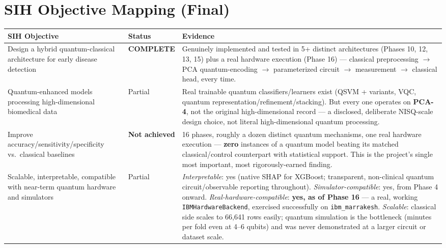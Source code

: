 \documentclass[11pt,a4paper]{article}
\newcommand{\code}[1]{\texttt{\small #1}}
\newcommand{\done}{\textcolor{donecolor}{\textbf{COMPLETE}}}
\begin{document}
\section{SIH Objective Mapping (Final)}
\label{sec:objective-mapping}

\begin{center}
\small
\begin{tabularx}{\textwidth}{@{}p{5.6cm}p{2.0cm}Y@{}}
\toprule
\textbf{SIH Objective} & \textbf{Status} & \textbf{Evidence} \\
\midrule
Design a hybrid quantum-classical architecture for early disease detection & \done & Genuinely implemented and tested in 5+ distinct architectures (Phases 10, 12, 13, 15) plus a real hardware execution (Phase 16) --- classical preprocessing $\to$ PCA quantum-encoding $\to$ parameterized circuit $\to$ measurement $\to$ classical head, every time. \\
Quantum-enhanced models processing high-dimensional biomedical data & Partial & Real trainable quantum classifiers/learners exist (QSVM + variants, VQC, quantum representation/refinement/stacking). But every one operates on \textbf{PCA-4}, not the original high-dimensional record --- a disclosed, deliberate NISQ-scale design choice, not literal high-dimensional quantum processing. \\
Improve accuracy/sensitivity/specificity vs.\ classical baselines & \textbf{Not achieved} & 16 phases, roughly a dozen distinct quantum mechanisms, one real hardware execution --- \textbf{zero} instances of a quantum model beating its matched classical/control counterpart with statistical support. This is the project's single most important, most rigorously-earned finding. \\
Scalable, interpretable, compatible with near-term quantum hardware and simulators & Partial & \emph{Interpretable}: yes (native SHAP for XGBoost; transparent, non-clinical quantum circuit/observable reporting throughout). \emph{Simulator-compatible}: yes, from Phase 4 onward. \emph{Real-hardware-compatible}: \textbf{yes, as of Phase 16} --- a real, working \code{IBMHardwareBackend}, exercised successfully on \code{ibm\_marrakesh}. \emph{Scalable}: classical side scales to 66,641 rows easily; quantum simulation is the bottleneck (minutes per fold even at 4--6 qubits) and was never demonstrated at a larger circuit or dataset scale. \\

\end{tabularx}
\end{center}
\end{document}
